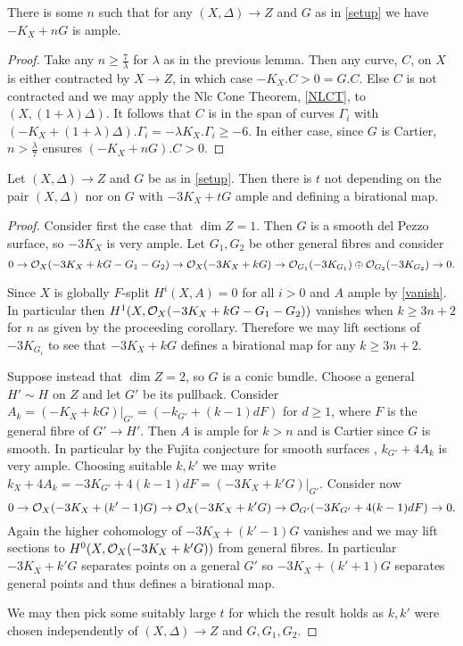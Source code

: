 \begin{corollary}\label{nAmple}
	There is some $n$ such that for any $(X,\Delta) \to Z$ and $G$ as in \autoref{setup} we have $-K_{X}+nG$ is ample.
\end{corollary}


\begin{proof}
	Take any $n \geq \frac{7}{\lambda}$ for $\lambda$ as in the previous lemma. Then any curve, $C$, on $X$ is either contracted by $X \to Z$, in which case $-K_{X}.C>0=G.C$. Else $C$ is not contracted and we may apply the Nlc Cone Theorem, \autoref{NLCT}, to $(X,(1+\lambda)\Delta)$. It follows that $C$ is in the span of curves $\Gamma_{i}$ with $(-K_{X}+(1+\lambda)\Delta).\Gamma_{i} = -\lambda K_{X}.\Gamma_{i} \geq -6$. In either case, since $G$ is Cartier, $n> \frac{\lambda}{7}$ ensures $(-K_{X}+nG).C >0$.
\end{proof}

\begin{theorem}
	Let $(X,\Delta) \to Z$ and $G$ be as in \autoref{setup}. Then there is $t$ not depending on the pair $(X,\Delta)$ nor on $G$ with $-3K_{X}+tG$ ample and defining a birational map. 
\end{theorem}
\begin{proof}
	Consider first the case that $\dim Z=1$. Then $G$ is a smooth del Pezzo surface, so $-3K_{X}$ is very ample. Let $G_{1},G_{2}$ be other general fibres and consider
	\[0 \to \mathcal{O}_{X}(-3K_{X}+kG-G_{1}-G_{2}) \to \mathcal{O}_{X}(-3K_{X}+kG) \to \mathcal{O}_{G_{1}}(-3K_{G_{1}})\oplus \mathcal{O}_{G_{2}}(-3K_{G_{2}}) \to 0.\]
	
	Since $X$ is globally $F$-split $H^{i}(X,A)=0$ for all $i>0$ and $A$ ample by \autoref{vanish}. In particular then $H^{1}(X,\mathcal{O}_{X}(-3K_{X}+kG-G_{1}-G_{2}))$ vanishes when $k\geq 3n+2$ for $n$ as given by the proceeding corollary. Therefore we may lift sections of $-3K_{G_{i}}$ to see that $-3K_{X}+kG$ defines a birational map for any $k \geq 3n+2$. 
	
	Suppose instead that $\dim Z=2$, so $G$ is a conic bundle. Choose a general $H'\sim H$ on $Z$ and let $G'$ be its pullback. Consider $A_{k}=(-K_{X}+kG)|_{G'}=(-k_{G'}+(k-1)dF)$ for $d \geq 1$, where $F$ is the general fibre of $G'\to H'$. Then $A$ is ample for $k >n$ and is Cartier since $G$ is smooth. In particular by the Fujita conjecture for smooth surfaces \cite[Corollary 2.5]{terakawa1999d}, $k_{G'}+4A_{k}$ is very ample. Choosing suitable $k,k'$ we may write $k_{X}+4A_{k}=-3K_{G'}+4(k-1)dF=(-3K_{X}+k'G)|_{G'}$. Consider now
	\[0 \to \mathcal{O}_{X}(-3K_{X}+(k'-1)G)\to \mathcal{O}_{X}(-3K_{X}+k'G)\to \mathcal{O}_{G'}(-3K_{G'}+4(k-1)dF) \to 0.\]
	Again the higher cohomology of $-3K_{X}+(k'-1)G$ vanishes and we may lift sections to $H^{0}(X,\mathcal{O}_{X}(-3K_{X}+k'G))$ from general fibres. In particular $-3K_{X}+k'G$ separates points on a general $G'$ so $-3K_{X}+(k'+1)G$ separates general points and thus defines a birational map. 
	
	We may then pick some suitably large $t$ for which the result holds as $k,k'$ were chosen independently of $(X,\Delta) \to Z$ and $G,G_{1},G_{2}$.
\end{proof}

